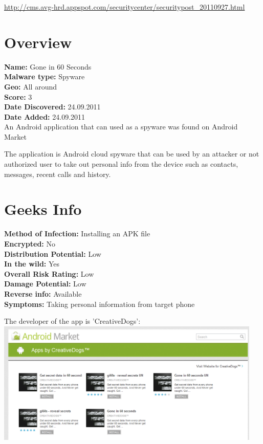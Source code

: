 {\scriptsize\url{http://cms.avg-hrd.appspot.com/securitycenter/securitypost_20110927.html}}

\section{Overview}

\textbf{Name:} Gone in 60 Seconds \\
\textbf{Malware type:} Spyware \\
\textbf{Geo:} All around \\
\textbf{Score:} 3 \\
\textbf{Date Discovered:} 24.09.2011 \\
\textbf{Date Added:} 24.09.2011 \\

An Android application that can used as a spyware was found on Android Market

The application is Android cloud spyware that can be used by an attacker or not authorized user to take out personal info from the device such as contacts, messages, recent calls and history.

\section{Geeks Info}

\textbf{Method of Infection:} Installing an APK file \\
\textbf{Encrypted:} No \\
\textbf{Distribution Potential:} Low \\
\textbf{In the wild:} Yes \\
\textbf{Overall Risk Rating:} Low \\
\textbf{Damage Potential:} Low \\
\textbf{Reverse info:} Available \\
\textbf{Symptoms:} Taking personal information from target phone \\

\parbox{\textwidth}{
The developer of the app is 'CreativeDogs': \\
\includegraphics[width=0.95\textwidth]{figs/gone60_1.png}
}

